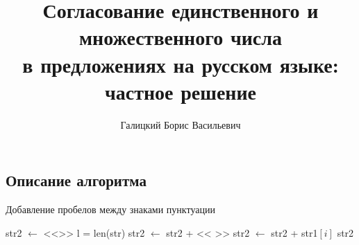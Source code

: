 \documentclass[a4paper,12pt]{article} %
\title{Согласование единственного и множественного числа\\ в предложениях на русском языке: частное решение}
\author{Галицкий Борис Васильевич}
\theoremstyle{definition}
\theoremstyle{plain}
\begin{document}
\maketitle

\subsection*{Описание алгоритма}



\begin{algorithm}
\caption{Добавление пробелов между знаками пунктуации}
\begin{algorithmic}[1]
\State str2 $\gets $ <<>> 
\State l = len(str)
\State str2 $\gets$ str2 + << >>
\EndIf
\State str2 $\gets$ str2 + str1$[i]$
\EndFor
\State\Return str2
\EndFunction
\end{algorithmic}
\end{algorithm}
\end{document}
